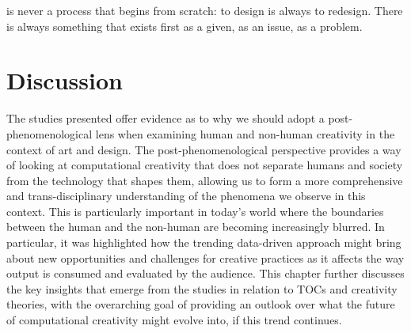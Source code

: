 \begin{savequote}[75mm]
	 [Design] is never a process that begins from scratch: to design is always to redesign. There is always something that exists first as a given, as an issue, as a problem.
\end{savequote}

\chapter{Discussion}
 The studies presented offer evidence as to why we should adopt a post-phenomenological lens when examining human and non-human creativity in the context of art and design. The post-phenomenological perspective provides a way of looking at computational creativity that does not separate humans and society from the technology that shapes them, allowing us to form a more comprehensive and trans-disciplinary understanding of the phenomena we observe in this context. This is particularly important in today's world where the boundaries between the human and the non-human are becoming increasingly blurred. In particular, it was highlighted how the trending data-driven approach might bring about new opportunities and challenges for creative practices as it affects the way output is consumed and evaluated by the audience. This chapter further discusses the key insights that emerge from the studies in relation to TOCs and creativity theories, with the overarching goal of providing an outlook over what the future of computational creativity might evolve into, if this trend continues.


